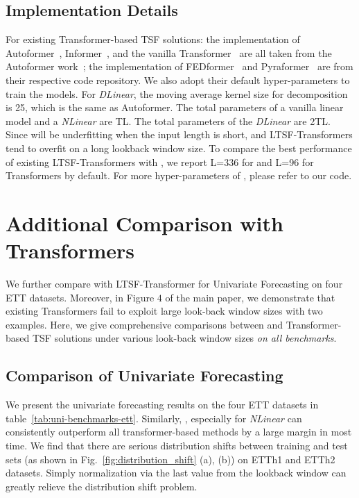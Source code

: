 \subsection{Implementation Details}
For existing Transformer-based TSF solutions: the implementation of Autoformer~\cite{xu2021autoformer}, Informer~\cite{informer}, and the vanilla Transformer~\cite{vaswani2017attention} are all taken from the Autoformer work~\cite{xu2021autoformer}; the implementation of FEDformer~\cite{zhou2022fedformer} and Pyraformer~\cite{liu2021pyraformer} are from their respective code repository. We also adopt their default hyper-parameters to train the models. For \emph{DLinear}, the moving average kernel size for decomposition is 25, which is the same as Autoformer. The total parameters of a vanilla linear model and a \emph{NLinear} are T\*L. The total parameters of the \emph{DLinear} are 2\*T\*L. Since \modelname will be underfitting when the input length is short, and LTSF-Transformers tend to overfit on a long lookback window size. To compare the best performance of existing LTSF-Transformers with \modelname, we report L=336 for \modelname and L=96 for Transformers by default. For more hyper-parameters of \modelname, please refer to our code.



\section{Additional Comparison with Transformers}
\label{sec:supp_add}
We further compare \modelname with LTSF-Transformer for  Univariate Forecasting on four ETT datasets. Moreover, in Figure $4$ of the main paper, we demonstrate that existing Transformers fail to exploit large look-back window sizes with two examples. Here, we give comprehensive comparisons between \modelname and Transformer-based TSF solutions under various look-back window sizes \emph{on all benchmarks}.



\subsection{Comparison of Univariate Forecasting}

We present the univariate forecasting results on the four ETT datasets in table~\ref{tab:uni-benchmarks-ett}. Similarly, \modelname, especially for \emph{NLinear} can consistently outperform all transformer-based methods by a large margin in most time. We find that there are serious distribution shifts between training and test sets (as shown in Fig.~\ref{fig:distribution_shift} (a), (b)) on ETTh1 and ETTh2 datasets. Simply normalization via the last value from the lookback window can greatly relieve the distribution shift problem.

